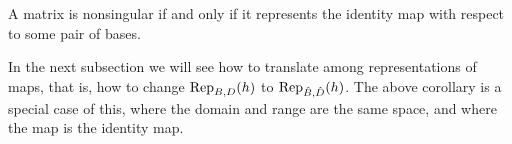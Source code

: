 \begin{corollary}
A matrix is nonsingular if and only if it represents the identity map
with respect to some pair of bases.
\end{corollary}




In the next subsection we will
see how to translate among representations of 
maps, that is, how to change
$\rep{h}{B,D}$ to $\rep{h}{\hat{B},\hat{D}}$.
The above corollary is a special case of this, where the domain and range are
the same space, and where the map is the identity map.



